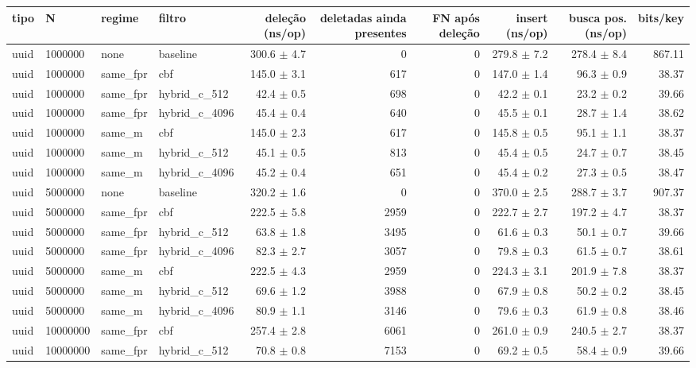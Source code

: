 \begin{tabular}{llllrrrrrr}
\toprule
tipo & N & regime & filtro & deleção (ns/op) & deletadas ainda presentes & FN após deleção & insert (ns/op) & busca pos. (ns/op) & bits/key \\
\midrule
uuid & 1000000 & none & baseline & 300.6 $\pm$ 4.7 & 0 & 0 & 279.8 $\pm$ 7.2 & 278.4 $\pm$ 8.4 & 867.11 \\
uuid & 1000000 & same\_fpr & cbf & 145.0 $\pm$ 3.1 & 617 & 0 & 147.0 $\pm$ 1.4 & 96.3 $\pm$ 0.9 & 38.37 \\
uuid & 1000000 & same\_fpr & hybrid\_c\_512 & 42.4 $\pm$ 0.5 & 698 & 0 & 42.2 $\pm$ 0.1 & 23.2 $\pm$ 0.2 & 39.66 \\
uuid & 1000000 & same\_fpr & hybrid\_c\_4096 & 45.4 $\pm$ 0.4 & 640 & 0 & 45.5 $\pm$ 0.1 & 28.7 $\pm$ 1.4 & 38.62 \\
uuid & 1000000 & same\_m & cbf & 145.0 $\pm$ 2.3 & 617 & 0 & 145.8 $\pm$ 0.5 & 95.1 $\pm$ 1.1 & 38.37 \\
uuid & 1000000 & same\_m & hybrid\_c\_512 & 45.1 $\pm$ 0.5 & 813 & 0 & 45.4 $\pm$ 0.5 & 24.7 $\pm$ 0.7 & 38.45 \\
uuid & 1000000 & same\_m & hybrid\_c\_4096 & 45.2 $\pm$ 0.4 & 651 & 0 & 45.4 $\pm$ 0.2 & 27.3 $\pm$ 0.5 & 38.47 \\
uuid & 5000000 & none & baseline & 320.2 $\pm$ 1.6 & 0 & 0 & 370.0 $\pm$ 2.5 & 288.7 $\pm$ 3.7 & 907.37 \\
uuid & 5000000 & same\_fpr & cbf & 222.5 $\pm$ 5.8 & 2959 & 0 & 222.7 $\pm$ 2.7 & 197.2 $\pm$ 4.7 & 38.37 \\
uuid & 5000000 & same\_fpr & hybrid\_c\_512 & 63.8 $\pm$ 1.8 & 3495 & 0 & 61.6 $\pm$ 0.3 & 50.1 $\pm$ 0.7 & 39.66 \\
uuid & 5000000 & same\_fpr & hybrid\_c\_4096 & 82.3 $\pm$ 2.7 & 3057 & 0 & 79.8 $\pm$ 0.3 & 61.5 $\pm$ 0.7 & 38.61 \\
uuid & 5000000 & same\_m & cbf & 222.5 $\pm$ 4.3 & 2959 & 0 & 224.3 $\pm$ 3.1 & 201.9 $\pm$ 7.8 & 38.37 \\
uuid & 5000000 & same\_m & hybrid\_c\_512 & 69.6 $\pm$ 1.2 & 3988 & 0 & 67.9 $\pm$ 0.8 & 50.2 $\pm$ 0.2 & 38.45 \\
uuid & 5000000 & same\_m & hybrid\_c\_4096 & 80.9 $\pm$ 1.1 & 3146 & 0 & 79.6 $\pm$ 0.3 & 61.9 $\pm$ 0.8 & 38.46 \\
uuid & 10000000 & same\_fpr & cbf & 257.4 $\pm$ 2.8 & 6061 & 0 & 261.0 $\pm$ 0.9 & 240.5 $\pm$ 2.7 & 38.37 \\
uuid & 10000000 & same\_fpr & hybrid\_c\_512 & 70.8 $\pm$ 0.8 & 7153 & 0 & 69.2 $\pm$ 0.5 & 58.4 $\pm$ 0.9 & 39.66 \\

\end{tabular}
